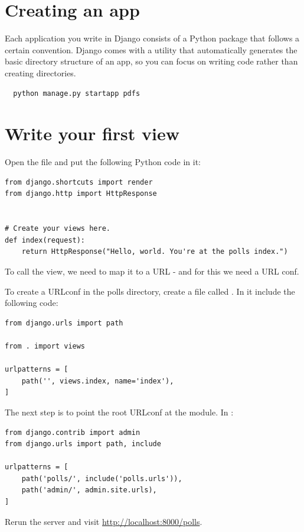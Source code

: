 \section{Creating an app}

Each application you write in Django consists of a Python package that follows a certain convention.
Django comes with a utility that automatically generates the basic directory structure of an app, so you can focus on writing code rather than creating directories.

\begin{lstlisting}
  python manage.py startapp pdfs
\end{lstlisting}


\section{Write your first view}

Open the file  and put the following Python code in it:
\lstset{language=Python}
\begin{lstlisting}
from django.shortcuts import render
from django.http import HttpResponse


# Create your views here.
def index(request):
    return HttpResponse("Hello, world. You're at the polls index.")
\end{lstlisting}

  
To call the view, we need to map it to a URL - and for this we need a URL conf.


To create a URLconf in the polls directory, create a file called .
In it include the following code:
\begin{lstlisting}
from django.urls import path

from . import views

urlpatterns = [
    path('', views.index, name='index'),
]
\end{lstlisting}


The next step is to point the root URLconf at the  module. In :
\begin{lstlisting}
from django.contrib import admin
from django.urls import path, include

urlpatterns = [
    path('polls/', include('polls.urls')),
    path('admin/', admin.site.urls),
]
\end{lstlisting}


Rerun the server and visit \url{http://localhost:8000/polls}.
